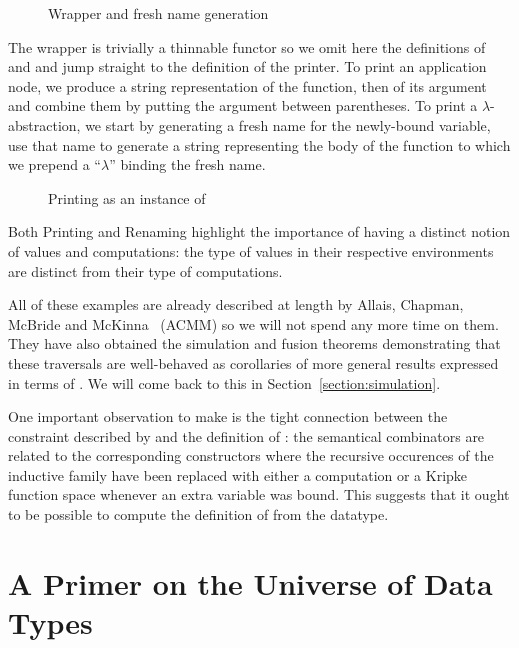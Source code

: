 \begin{figure}[h]
\caption{Wrapper and fresh name generation}
\end{figure}

The wrapper  is trivially a thinnable functor so we omit here
the definitions of  and  and jump straight
to the definition of the printer. To print an application node, we produce
a string representation of the function, then of its argument and combine
them by putting the argument between parentheses. To print a $\lambda$-abstraction,
we start by generating a fresh name for the newly-bound variable, use that
name to generate a string representing the body of the function to which we
prepend a ``$\lambda$'' binding the fresh name.

\begin{figure}[h]
\caption{Printing as an instance of }
\end{figure}

Both Printing and Renaming highlight the importance of having a distinct
notion of values and computations: the type of values in their respective
environments are distinct from their type of computations.

All of these examples are already described at length by Allais, Chapman,
McBride and McKinna~\citeyear{allais2017type} (ACMM) so we will not spend any
more time on them. They have also obtained the simulation and fusion
theorems demonstrating that these traversals are well-behaved as
corollaries of more general results expressed in terms of .
We will come back to this in Section~\ref{section:simulation}.

One important observation to make is the tight connection between the
constraint described by  and the definition of : the
semantical combinators are related to the corresponding constructors
where the recursive occurences of the inductive family have been replaced
with either a computation or a Kripke function space whenever an
extra variable was bound. This suggests that it ought to be possible
to compute the definition of  from the datatype.




\section{A Primer on the Universe of Data Types}

